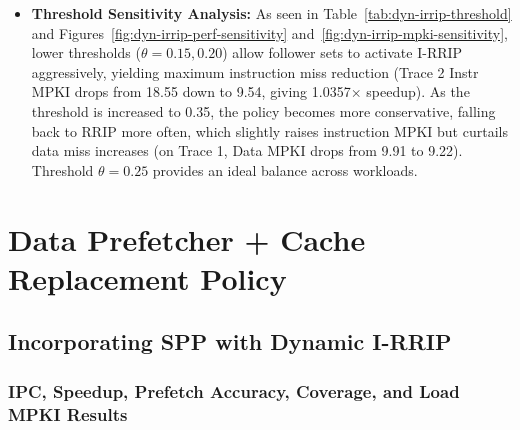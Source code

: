 \documentclass[a4paper, 11pt]{article}
\begin{document}
\begin{itemize}
    \item \textbf{Threshold Sensitivity Analysis:}
    As seen in Table~\ref{tab:dyn-irrip-threshold} and Figures~\ref{fig:dyn-irrip-perf-sensitivity} and~\ref{fig:dyn-irrip-mpki-sensitivity}, lower thresholds ($\theta = 0.15, 0.20$) allow follower sets to activate I-RRIP aggressively, yielding maximum instruction miss reduction (Trace 2 Instr MPKI drops from 18.55 down to 9.54, giving 1.0357$\times$ speedup). As the threshold is increased to 0.35, the policy becomes more conservative, falling back to RRIP more often, which slightly raises instruction MPKI but curtails data miss increases (on Trace 1, Data MPKI drops from 9.91 to 9.22). Threshold $\theta = 0.25$ provides an ideal balance across workloads.
\end{itemize}


\section{Data Prefetcher + Cache Replacement Policy}
\subsection{Incorporating SPP with Dynamic I-RRIP}
\subsubsection{IPC, Speedup, Prefetch Accuracy, Coverage, and Load MPKI Results}
\end{document}

